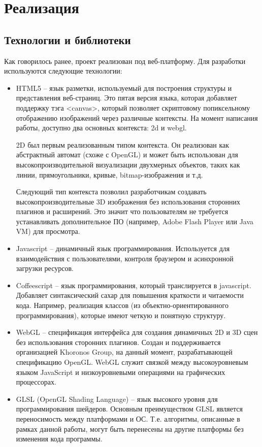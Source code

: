 \newpage
\section{Реализация}

\subsection{Технологии и библиотеки}

Как говорилось ранее, проект реализован под веб-платформу. Для разработки используются следующие технологии:

\begin{itemize}
  \item HTML5 -- язык разметки, используемый для построения структуры и представления веб-страниц. 
    Это пятая версия языка, которая добавляет поддержку тэга \textless{}canvas\textgreater{}, 
    который позволяет скриптовому попиксельному отображению изображений через различные контексты. 
    На момент написания работы, доступно два основных контекста: 2d и webgl.

    2D был первым реализованным типом контекста. Он реализован как абстрактный автомат (схоже 
    с OpenGL) и может быть использован для высокопроизводительной визуализации двухмерных объектов, 
    таких как линии, прямоугольники, кривые, bitmap-изображения и т.д.

    Следующий тип контекста позволил разработчикам создавать высокопроизводительные 3D изображения 
    без использования сторонних плагинов и расширений. Это значит что пользователям не требуется 
    устанавливать дополнительное ПО (например, Adobe Flash Player или Java VM) для просмотра.

  \item Javascript -- динамичный язык программирования. Используется для взаимодействия с 
    пользователями, контроля браузером и асинхронной загрузки ресурсов.

  \item Coffeescript -- язык программирования, который транслируется в javascript. Добавляет 
    синтаксический сахар для повышения краткости и читаемости кода. Например, реализация классов 
    (из объектно-ориентированного программирования), которые имеют четкую и понятную структуру.

  \item WebGL -- спецификация интерфейса для создания динамичных 2D и 3D сцен без использования 
    сторонних плагинов. Создан и поддерживается организацией Khoronos Group, на данный момент, 
    разрабатывающей спецификацию OpenGL.  WebGL служит связкой между высокоуровневым языком 
    JavaScript и низкоуровневыми операциями на графических процессорах.

  \item GLSL (OpenGL Shading Language) -- язык высокого уровня для программирования шейдеров. 
    Основным преимуществом GLSL является переносимость между платформами и ОС. Т.е. алгоритмы, 
    описанные в рамках данной работы, могут быть перенесены на другие платформы без изменения 
    кода программы.
\end{itemize}

